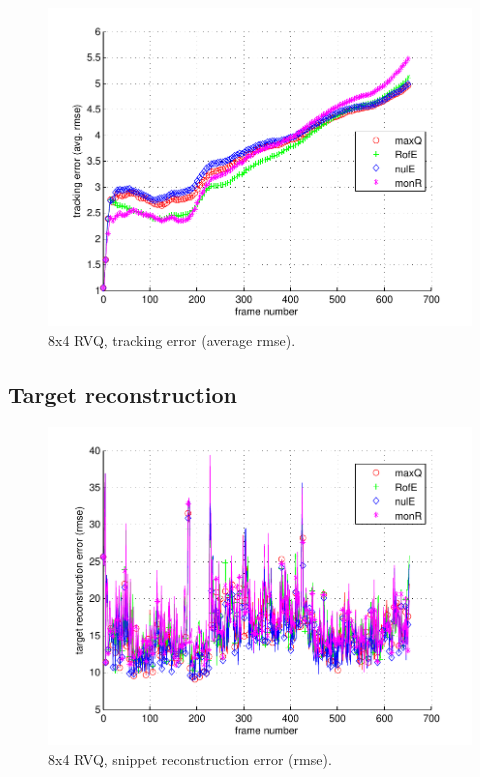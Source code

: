 								\begin{figure}[h!]
								\centering
								\includegraphics[height=0.38\textheight]{thesis/6_car4_8_4_1000_trk_armse.pdf}
								\caption{8x4 RVQ, tracking error (average rmse).}
								\label{fig:6_car4_8_4_1000_trk_avg_rmse}
								\end{figure}

\clearpage
\newpage
\subsection{Target reconstruction}

								\begin{figure}[h!]
								\centering
								\includegraphics[height=0.4\textheight]{thesis/6_car4_8_4_1000_snp_rmse.pdf}
								\caption{8x4 RVQ, snippet reconstruction error (rmse).}
								\label{fig:6_car4_8_4_1000_snp_rmse}
								\end{figure}


